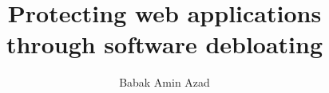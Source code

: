 \documentclass[phd,bottom,nosig]{usbthesis}
\author{Babak Amin Azad}%
\title{Protecting web applications through software debloating}%
\begin{document}
\singlespacing %
\maketitle %

\begin{abstract}

\end{abstract}
\tableofcontents %
\listoffigures %
%
%
\begin{acknowledgements}
    
\end{acknowledgements}
\pagestyle{thesis}
\newpage
{}






\renewcommand{\baselinestretch}{1}
\normalsize

\clearpage
\newpage
{}%
%


\clearpage
\newpage

\appendix
% 
%
\end{document}
